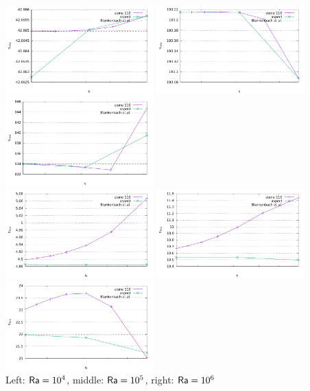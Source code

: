 \begin{center}
\includegraphics[width=5.7cm]{python_codes/fieldstone_110/results_BA/slopes/vrms_1e4}
\includegraphics[width=5.7cm]{python_codes/fieldstone_110/results_BA/slopes/vrms_1e5}
\includegraphics[width=5.7cm]{python_codes/fieldstone_110/results_BA/slopes/vrms_1e6}\\
\includegraphics[width=5.7cm]{python_codes/fieldstone_110/results_BA/slopes/q_1e4}
\includegraphics[width=5.7cm]{python_codes/fieldstone_110/results_BA/slopes/q_1e5}
\includegraphics[width=5.7cm]{python_codes/fieldstone_110/results_BA/slopes/q_1e6}\\
{\captionfont Left: ${\mathsf{Ra}}=10^4$, middle: ${\mathsf{Ra}}=10^5$, right: ${\mathsf{Ra}}=10^6$} 
\end{center}

